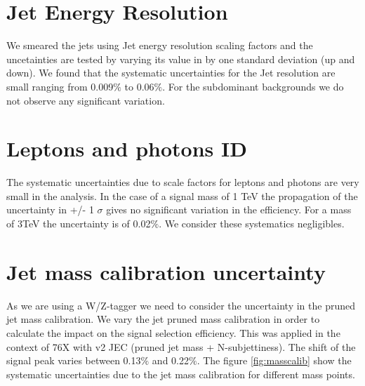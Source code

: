 \section{Jet Energy Resolution}

We smeared the jets using Jet energy resolution scaling factors and the uncetainties are tested by varying its value in by one standard deviation (up and down). We found that the systematic uncertainties for the Jet resolution are small ranging from 0.009$\%$ to 0.06$\%$. For the subdominant backgrounds we do not observe any significant variation.


\section{Leptons and photons ID}

The systematic uncertainties due to scale factors for leptons and photons are very small in the analysis. In the case of a signal mass of 1 TeV the propagation of the uncertainty in +/- 1 $\sigma$ gives no significant variation in the efficiency. For a mass of 3TeV the uncertainty is of 0.02$\%$. We consider these systematics negligibles.

\section{Jet mass calibration uncertainty}

As we are using a W/Z-tagger we need to consider the uncertainty in the pruned jet mass calibration. We vary the jet pruned mass calibration in order to calculate the impact on the signal selection efficiency. This was applied in the context of 76X with v2 JEC (pruned jet mass + N-subjettiness). The shift of the signal peak varies between 0.13$\%$ and 0.22$\%$. The figure \ref{fig:masscalib} show the systematic uncertainties due to the jet mass calibration for different mass points.

